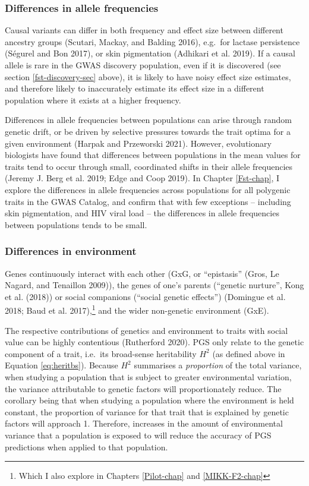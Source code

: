 \documentclass[
]{book}
\begin{document}
\hypertarget{differences-in-allele-frequencies}{%
\subsubsection{Differences in allele frequencies}\label{differences-in-allele-frequencies}}

Causal variants can differ in both frequency and effect size between different ancestry groups (Scutari, Mackay, and Balding 2016), e.g.~for lactase persistence (Ségurel and Bon 2017), or skin pigmentation (Adhikari et al. 2019). If a causal allele is rare in the GWAS discovery population, even if it is discovered (see section \ref{fst-discovery-sec} above), it is likely to have noisy effect size estimates, and therefore likely to inaccurately estimate its effect size in a different population where it exists at a higher frequency.

Differences in allele frequencies between populations can arise through random genetic drift, or be driven by selective pressures towards the trait optima for a given environment (Harpak and Przeworski 2021). However, evolutionary biologists have found that differences between populations in the mean values for traits tend to occur through small, coordinated shifts in their allele frequencies (Jeremy J. Berg et al. 2019; Edge and Coop 2019). In Chapter \ref{Fst-chap}, I explore the differences in allele frequencies across populations for all polygenic traits in the GWAS Catalog, and confirm that with few exceptions -- including skin pigmentation, and HIV viral load -- the differences in allele frequencies between populations tends to be small.

\hypertarget{fst-env-sec}{%
\subsubsection{Differences in environment}\label{fst-env-sec}}

Genes continuously interact with each other (GxG, or ``epistasis'' (Gros, Le Nagard, and Tenaillon 2009)), the genes of one's parents (``genetic nurture'', Kong et al. (2018)) or social companions (``social genetic effects'') (Domingue et al. 2018; Baud et al. 2017),\footnote{Which I also explore in Chapters \ref{Pilot-chap} and \ref{MIKK-F2-chap}} and the wider non-genetic environment (GxE).

The respective contributions of genetics and environment to traits with social value can be highly contentious (Rutherford 2020). PGS only relate to the genetic component of a trait, i.e.~its broad-sense heritability \(H^2\) (as defined above in Equation \eqref{eq:heritbs}). Because \(H^2\) summarises a \emph{proportion} of the total variance, when studying a population that is subject to greater environmental variation, the variance attributable to genetic factors will proportionately reduce. The corollary being that when studying a population where the environment is held constant, the proportion of variance for that trait that is explained by genetic factors will approach 1. Therefore, increases in the amount of environmental variance that a population is exposed to will reduce the accuracy of PGS predictions when applied to that population.
\end{document}
